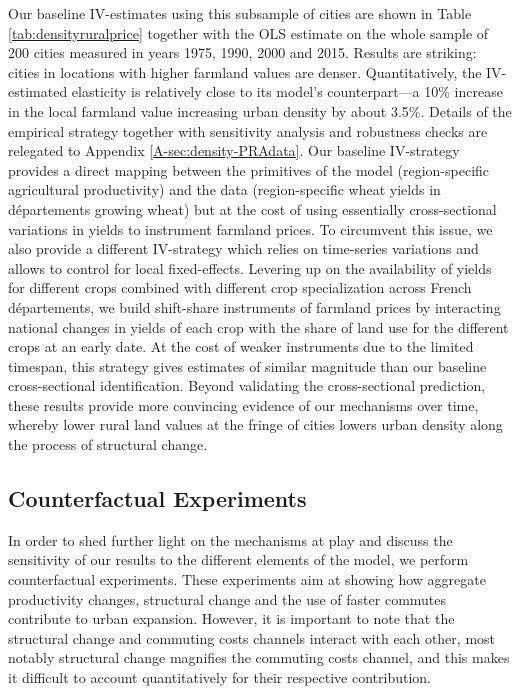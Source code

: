 \documentclass[./20250130-paper.tex]{subfiles}
\begin{document}
Our baseline IV-estimates using this subsample of cities are shown in Table \ref{tab:densityruralprice} together with the OLS estimate on the whole sample of 200 cities measured in years 1975, 1990, 2000 and 2015. Results are striking: cities in locations with higher farmland values are denser. Quantitatively, the IV-estimated elasticity is relatively close to its model's counterpart---a 10\% increase in the local farmland value increasing urban density by about 3.5\%. Details of the empirical strategy together with sensitivity analysis and robustness checks are relegated to
Appendix \ref{A-sec:density-PRAdata}. Our baseline IV-strategy provides a direct mapping between the primitives of the model (region-specific agricultural productivity) and the data (region-specific wheat yields in départements growing wheat) but at the cost of using essentially cross-sectional variations in yields to instrument farmland prices. To circumvent this issue, we also provide a different IV-strategy which relies on time-series variations and allows to control for local fixed-effects. Levering up on the availability of yields for different crops combined with different crop specialization across French départements, we build shift-share instruments of farmland prices by interacting national changes in yields of each crop with the share of land use for the different crops at an early date. At the cost of weaker instruments due to the limited timespan, this strategy gives estimates of similar magnitude than our baseline cross-sectional identification. Beyond validating the cross-sectional prediction, these results provide more convincing evidence of our mechanisms over time, whereby lower rural land values at the fringe of cities lowers urban density along the process of structural change. 






\subsection{Counterfactual Experiments}\label{sec:sensitivityQ}

In order to shed further light on the mechanisms at play and discuss the sensitivity of our results to the different elements of the model, we perform counterfactual experiments. These experiments aim at showing how aggregate productivity changes, structural change and the use of faster commutes contribute to urban expansion. However, it is important to note that the structural change and commuting costs channels interact with each other, most notably structural change magnifies the commuting costs channel, and this makes it difficult to account quantitatively for their respective contribution.
\end{document}
